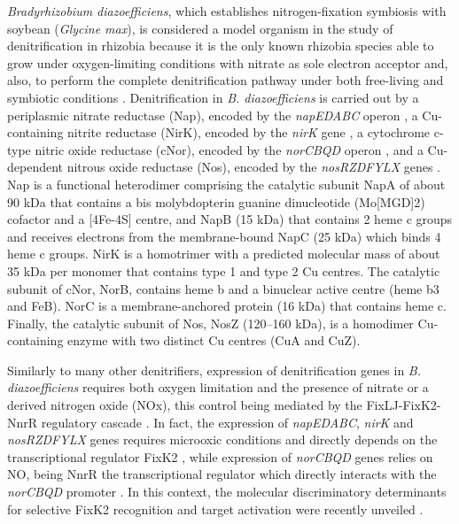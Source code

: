 \documentclass[12pt]{article}
\begin{document}
{{\em Bradyrhizobium diazoefficiens}, which establishes nitrogen-fixation symbiosis with soybean
({\em Glycine max}), is considered a model organism in the study of denitrification in
rhizobia because it is the only known rhizobia species able to grow under oxygen-limiting
conditions with nitrate as sole electron acceptor and, also, to perform the complete denitrification
pathway under both free-living and symbiotic conditions \nocite{bedmar2005complete}. Denitrification
in {\em B. diazoefficiens} is carried out by a periplasmic nitrate reductase (Nap), encoded by the
{\em napEDABC} operon \nocite{delgado2003bradyrhizobium}, a Cu-containing nitrite reductase (NirK), encoded by the {\em nirK}
gene \nocite{velasco2001characterization}, a cytochrome c-type nitric oxide reductase (cNor), encoded by the {\em norCBQD}
operon \nocite{mesa2002characterization}, and a Cu-dependent nitrous oxide reductase (Nos), encoded by the {\em nosRZDFYLX}
genes \nocite{velasco2004molecular}. Nap is a functional heterodimer comprising the catalytic subunit NapA of
about 90 kDa that contains a bis molybdopterin guanine dinucleotide (Mo[MGD]2) cofactor
and a [4Fe-4S] centre, and NapB (15 kDa) that contains 2 heme c groups and receives
electrons from the membrane-bound NapC (25 kDa) which binds 4 heme c groups. NirK
is a homotrimer with a predicted molecular mass of about 35 kDa per monomer that
contains type 1 and type 2 Cu centres. The catalytic subunit of cNor, NorB, contains heme b
and a binuclear active centre (heme b3 and FeB). NorC is a membrane-anchored protein
(16 kDa) that contains heme c. Finally, the catalytic subunit of Nos, NosZ (120–160 kDa), is
a homodimer Cu-containing enzyme with two distinct Cu centres (CuA and CuZ).

Similarly to many other denitrifiers, expression of denitrification genes in {\em B. diazoefficiens}
requires both oxygen limitation and the presence of nitrate or a derived nitrogen oxide
(NOx), this control being mediated by the FixLJ-FixK2-NnrR regulatory cascade \nocite{mesa2003bradyrhizobium}\nocite{mesa2008comprehensive}\nocite{bueno2017disparate}.
In fact, the expression of {\em napEDABC}, {\em nirK} and {\em nosRZDFYLX} genes requires microoxic
conditions and directly depends on the transcriptional regulator FixK2 \nocite{bueno2017disparate}\nocite{torres2017fixk2}, while expression
of {\em norCBQD} genes relies on NO, being NnrR the transcriptional regulator which
directly interacts with the {\em norCBQD} promoter \nocite{bueno2017disparate}\nocite{jimenez2019expanding}. In this context, the molecular discriminatory
determinants for selective FixK2 recognition and target activation were recently unveiled \nocite{cabrera2021dissection}.

}
\end{document}
